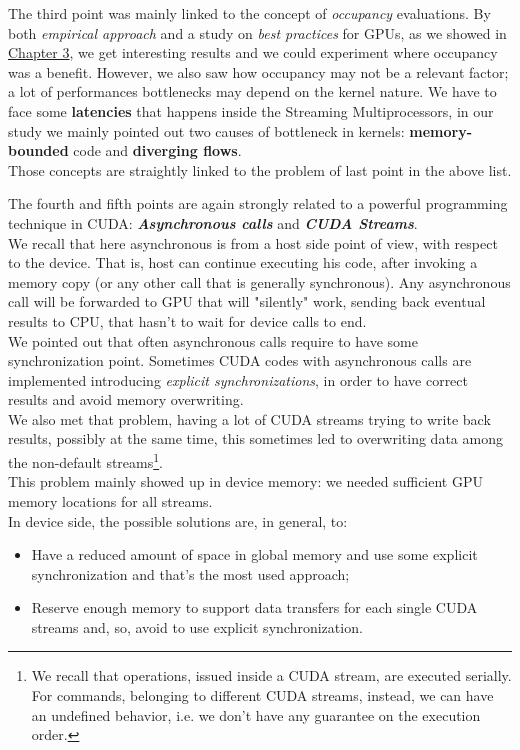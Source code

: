 The third point was mainly linked to the concept of \textit{occupancy} evaluations. By both \textit{empirical approach} and a study on \textit{best practices} for GPUs, as we showed in \hyperref[chap:logic]{Chapter 3}, we get interesting results and we could experiment where occupancy was a benefit. However, we also saw how occupancy may not be a relevant factor; a lot of performances bottlenecks may depend on the kernel nature. We have to face some \textbf{latencies} that happens inside the Streaming Multiprocessors, in our study we mainly pointed out two causes of bottleneck in kernels: \textbf{memory-bounded} code and \textbf{diverging flows}.\\
Those concepts are straightly linked to the problem of last point in the above list.

The fourth and fifth points are again strongly related to a powerful programming technique in CUDA:\textit{\textbf{ Asynchronous calls}} and \textit{\textbf{CUDA Streams}}.\\
We recall that here asynchronous is from a host side point of view, with respect to the device. That is, host can continue executing his code, after invoking a memory copy (or any other call that is generally synchronous). Any asynchronous call will be forwarded to GPU that will "silently" work, sending back eventual results to CPU, that hasn't to wait for device calls to end.\\
We pointed out that often asynchronous calls require to have some synchronization point. Sometimes CUDA codes with asynchronous calls are implemented introducing \textit{explicit synchronizations}, in order to have correct results and avoid memory overwriting.\\
We also met that problem, having a lot of CUDA streams trying to write back results, possibly at the same time, this sometimes led to overwriting data among the non-default streams\footnote{We recall that operations, issued inside a CUDA stream, are executed serially. For commands, belonging to different CUDA streams, instead, we can have an undefined behavior, i.e. we don't have any guarantee on the execution order.}.\\
This problem mainly showed up in device memory: we needed sufficient GPU memory locations for all streams.\\
In device side, the possible solutions are, in general, to:
\begin{itemize}
	\item Have a reduced amount of space in global memory and use some explicit synchronization and that's the most used approach;
	\item Reserve enough memory to support data transfers for each single CUDA streams and, so, avoid to use explicit synchronization.
\end{itemize}

